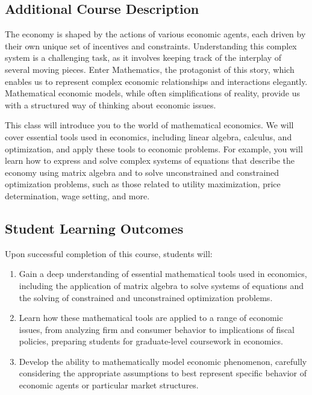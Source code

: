 \documentclass{./../Latex/syllabus}
\begin{document}
\subsection*{Additional Course Description}

The economy is shaped by the actions of various economic agents, each driven by their own unique set of incentives and constraints. Understanding this complex system is a challenging task, as it involves keeping track of the interplay of several moving pieces. Enter Mathematics, the protagonist of this story, which enables us to represent complex economic relationships and interactions elegantly. Mathematical economic models, while often simplifications of reality, provide us with a structured way of thinking about economic issues.

This class will introduce you to the world of mathematical economics. We will cover essential tools used in economics, including linear algebra, calculus, and optimization, and apply these tools to economic problems.  For example, you will learn how to express and solve complex systems of equations that describe the economy using matrix algebra and to solve unconstrained and constrained optimization problems, such as those related to utility maximization, price determination, wage setting, and more.


\subsection*{Student Learning Outcomes}
Upon successful completion of this course, students will:
\begin{enumerate}
\itemsep0em 
  \item Gain a deep understanding of essential mathematical tools used in economics, including the application of matrix algebra to solve systems of equations and the solving of constrained and unconstrained optimization problems.
  \item Learn how these mathematical tools are applied to a range of economic issues, from analyzing firm and consumer behavior to implications of fiscal policies, preparing students for graduate-level coursework in economics.
  \item Develop the ability to mathematically model economic phenomenon, carefully considering the appropriate assumptions to best represent specific behavior of economic agents or particular market structures.
\end{enumerate}
\end{document}
